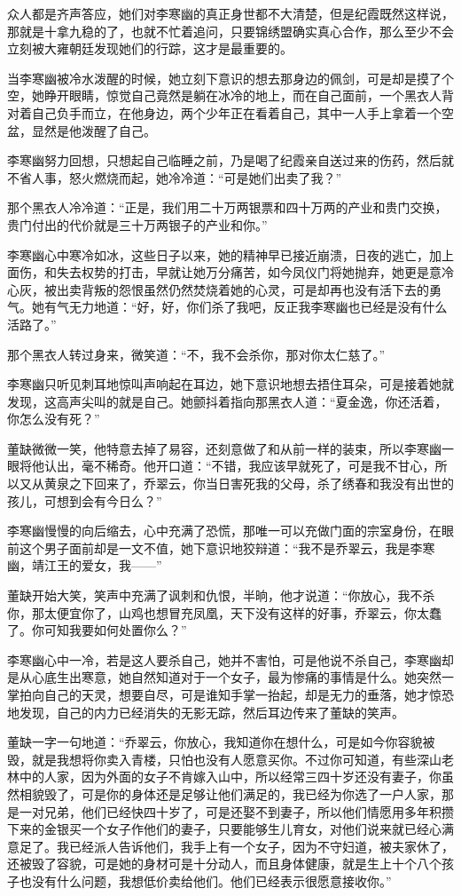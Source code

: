 众人都是齐声答应，她们对李寒幽的真正身世都不大清楚，但是纪霞既然这样说，那就是十拿九稳的了，也就不忙着追问，只要锦绣盟确实真心合作，那么至少不会立刻被大雍朝廷发现她们的行踪，这才是最重要的。

当李寒幽被冷水泼醒的时候，她立刻下意识的想去那身边的佩剑，可是却是摸了个空，她睁开眼睛，惊觉自己竟然是躺在冰冷的地上，而在自己面前，一个黑衣人背对着自己负手而立，在他身边，两个少年正在看着自己，其中一人手上拿着一个空盆，显然是他泼醒了自己。

李寒幽努力回想，只想起自己临睡之前，乃是喝了纪霞亲自送过来的伤药，然后就不省人事，怒火燃烧而起，她冷冷道：“可是她们出卖了我？”

那个黑衣人冷冷道：“正是，我们用二十万两银票和四十万两的产业和贵门交换，贵门付出的代价就是三十万两银子的产业和你。”

李寒幽心中寒冷如冰，这些日子以来，她的精神早已接近崩溃，日夜的逃亡，加上面伤，和失去权势的打击，早就让她万分痛苦，如今凤仪门将她抛弃，她更是意冷心灰，被出卖背叛的怨恨虽然仍然焚烧着她的心灵，可是却再也没有活下去的勇气。她有气无力地道：“好，好，你们杀了我吧，反正我李寒幽也已经是没有什么活路了。”

那个黑衣人转过身来，微笑道：“不，我不会杀你，那对你太仁慈了。”

李寒幽只听见刺耳地惊叫声响起在耳边，她下意识地想去捂住耳朵，可是接着她就发现，这高声尖叫的就是自己。她颤抖着指向那黑衣人道：“夏金逸，你还活着，你怎么没有死？”

董缺微微一笑，他特意去掉了易容，还刻意做了和从前一样的装束，所以李寒幽一眼将他认出，毫不稀奇。他开口道：“不错，我应该早就死了，可是我不甘心，所以又从黄泉之下回来了，乔翠云，你当日害死我的父母，杀了绣春和我没有出世的孩儿，可想到会有今日么？”

李寒幽慢慢的向后缩去，心中充满了恐慌，那唯一可以充做门面的宗室身份，在眼前这个男子面前却是一文不值，她下意识地狡辩道：“我不是乔翠云，我是李寒幽，靖江王的爱女，我——”

董缺开始大笑，笑声中充满了讽刺和仇恨，半晌，他才说道：“你放心，我不杀你，那太便宜你了，山鸡也想冒充凤凰，天下没有这样的好事，乔翠云，你太蠢了。你可知我要如何处置你么？”

李寒幽心中一冷，若是这人要杀自己，她并不害怕，可是他说不杀自己，李寒幽却是从心底生出寒意，她自然知道对于一个女子，最为惨痛的事情是什么。她突然一掌拍向自己的天灵，想要自尽，可是谁知手掌一抬起，却是无力的垂落，她才惊恐地发现，自己的内力已经消失的无影无踪，然后耳边传来了董缺的笑声。

董缺一字一句地道：“乔翠云，你放心，我知道你在想什么，可是如今你容貌被毁，就是我想将你卖入青楼，只怕也没有人愿意买你。不过你可知道，有些深山老林中的人家，因为外面的女子不肯嫁入山中，所以经常三四十岁还没有妻子，你虽然相貌毁了，可是你的身体还是足够让他们满足的，我已经为你选了一户人家，那是一对兄弟，他们已经快四十岁了，可是还娶不到妻子，所以他们情愿用多年积攒下来的金银买一个女子作他们的妻子，只要能够生儿育女，对他们说来就已经心满意足了。我已经派人告诉他们，我手上有一个女子，因为不守妇道，被夫家休了，还被毁了容貌，可是她的身材可是十分动人，而且身体健康，就是生上十个八个孩子也没有什么问题，我想低价卖给他们。他们已经表示很愿意接收你。”

